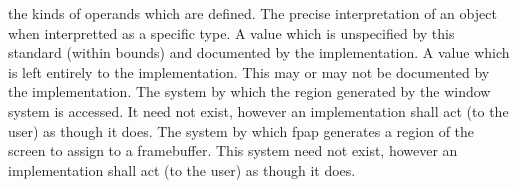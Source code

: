 the kinds of operands which are defined.
The precise interpretation of an object when interpretted as a specific type.
A value which is unspecified by this standard (within bounds) and documented by
the implementation.
A value which is left entirely to the implementation. This may or may not be
documented by the implementation.
The system by which the region generated by the window system is accessed. It
need not exist, however an implementation shall act (to the user) as though it
does.
The system by which fpap generates a region of the screen to assign to a
framebuffer. This system need not exist, however an implementation shall act
(to the user) as though it does.
\edefinitions
\vfill\break
